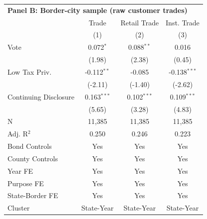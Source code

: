 \begingroup
\centering
\begin{tabular*}{\textwidth}{@{\extracolsep{\fill}}lccc}
\multicolumn{5}{l}{\textbf{Panel B: Border-city sample (raw customer trades)}}\\

\addlinespace
   \toprule
                         & Trade         & Retail Trade  & Inst. Trade\\  
                         & (1)           & (2)           & (3)\\  
   \midrule 
   Vote                  & 0.072$^{*}$   & 0.088$^{**}$  & 0.016\\   
                         & (1.98)       & (2.38)       & (0.45)\\   
   Low Tax Priv.         & -0.112$^{**}$ & -0.085        & -0.138$^{***}$\\   
                         & (-2.11)      & (-1.40)      & (-2.62)\\   
   Continuing Disclosure & 0.163$^{***}$ & 0.102$^{***}$ & 0.109$^{***}$\\   
                         & (5.65)       & (3.28)       & (4.83)\\   
   \hline
   N          & 11,385        & 11,385        & 11,385\\  
   Adj. R$^2$        & 0.250         & 0.246         & 0.223\\  
   Bond Controls         & Yes           & Yes           & Yes\\  
   County Controls       & Yes           & Yes           & Yes\\  
   Year FE               & Yes           & Yes           & Yes\\  
   Purpose FE            & Yes           & Yes           & Yes\\  
   State-Border FE       & Yes           & Yes           & Yes\\  
   Cluster              & State-Year & State-Year & State-Year\\  
   \bottomrule
\end{tabular*}
\par\endgroup
